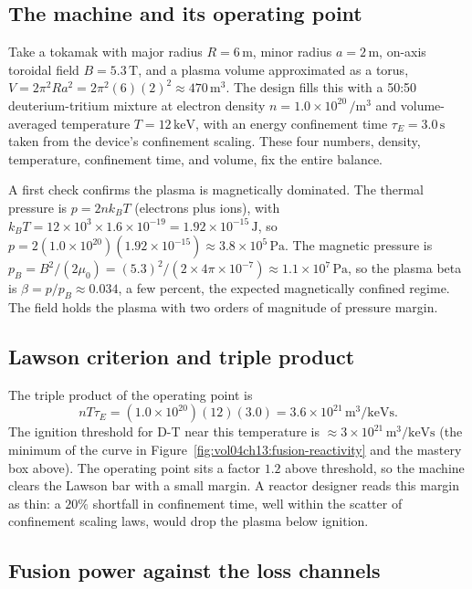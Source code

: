 \subsection{The machine and its operating point}

Take a tokamak with major radius $R = 6\,\si{\meter}$, minor radius $a =
2\,\si{\meter}$, on-axis toroidal field $B = 5.3\,\si{\tesla}$, and a
plasma volume approximated as a torus, $V = 2\pi^{2}R a^{2} = 2\pi^{2}(6)
(2)^{2} \approx 470\,\si{\meter\cubed}$. The design fills this with a 50:50
deuterium-tritium mixture at electron density $n = 1.0\times 10^{20}\,\si{
\per\meter\cubed}$ and volume-averaged temperature $T = 12\,\si{\kilo
\electronvolt}$, with an energy confinement time $\tau_E = 3.0\,\si{
\second}$ taken from the device's confinement scaling. These four numbers,
density, temperature, confinement time, and volume, fix the entire balance.

A first check confirms the plasma is magnetically dominated. The thermal
pressure is $p = 2nk_{B}T$ (electrons plus ions), with $k_{B}T = 12\times
10^{3}\times 1.6\times 10^{-19} = 1.92\times 10^{-15}\,\si{\joule}$, so $p =
2(1.0\times 10^{20})(1.92\times 10^{-15}) \approx 3.8\times 10^{5}\,\si{
\pascal}$. The magnetic pressure is $p_B = B^{2}/(2\mu_0) = (5.3)^{2}/
(2\times 4\pi\times 10^{-7}) \approx 1.1\times 10^{7}\,\si{\pascal}$, so the
plasma beta is $\beta = p/p_B \approx 0.034$, a few percent, the expected
magnetically confined regime. The field holds the plasma with two orders of
magnitude of pressure margin.

\subsection{Lawson criterion and triple product}

The triple product of the operating point is
\[
n T \tau_E = (1.0\times 10^{20})(12)(3.0)
= 3.6\times 10^{21}\,\si{\meter\cubed\per\kilo\electronvolt\second}.
\]
The ignition threshold for D-T near this temperature is $\approx 3\times
10^{21}\,\si{\meter\cubed\per\kilo\electronvolt\second}$ (the minimum of the
curve in Figure~\ref{fig:vol04ch13:fusion-reactivity} and the mastery box
above). The operating point sits a factor $1.2$ above threshold, so the
machine clears the Lawson bar with a small margin. A reactor designer reads
this margin as thin: a $20\%$ shortfall in confinement time, well within the
scatter of confinement scaling laws, would drop the plasma below ignition.

\subsection{Fusion power against the loss channels}

